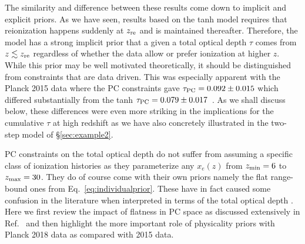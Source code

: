\documentclass[prd,twocolumn,amsmath,amssymb,floatfix,superscriptaddress,nofootinbib]{revtex4-1}
\begin{document}
The similarity and difference between these results come down to implicit and explicit priors. As we have seen, 
results based on the tanh model requires that reionization happens suddenly at $z_{\rm re}$ and is maintained thereafter.   Therefore, the model has a strong implicit prior that a given a total optical depth $\tau$ comes from $z\lesssim z_{\rm re}$ regardless of whether the data allow or prefer
ionization at higher $z$. While this prior may be well motivated theoretically, it should be distinguished from constraints that are data driven.  
This was especially apparent with the Planck 2015 data where the PC constraints gave $\tau_{\rm PC}=0.092\pm0.015$ which differed substantially from the tanh $\tau_{\rm PC}=0.079\pm0.017$~\cite{Heinrich:2016ojb}.  
As we shall discuss below, these differences were even more striking in the implications for the cumulative $\tau$ at high redshift as we have also concretely illustrated in the two-step model of \S \ref{sec:example2}.

PC constraints on the total optical depth do not suffer from assuming a specific class of ionization histories as they parameterize any $x_e(z)$ from $z_{\rm min}=6$ to $z_{\rm max}=30$.
They do of course come with their own priors namely the flat
range-bound ones from Eq.~\ref{eq:individualprior}.
These have in fact caused some confusion in the literature when interpreted in terms of the total optical depth \cite{Millea:2018bko}.  Here we first review the impact of flatness in PC space as discussed extensively in Ref.~\cite{Heinrich:2018btc} and then highlight the more important role of physicality priors with Planck 2018 data as compared with
2015 data.
\end{document}

